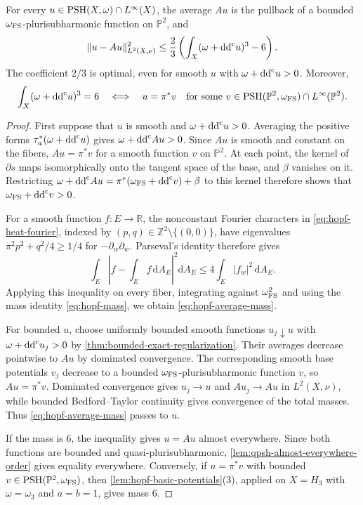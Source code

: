 \begin{proposition}\label{prop:hopf-fiber-average}
For every $u\in\mathrm{PSH}(X,\omega)\cap L^\infty(X)$, the average $Au$ is the pullback of a bounded $\omega_{\mathrm{FS}}$-plurisubharmonic function on $\mathbb P^2$, and
\begin{equation}\label{eq:hopf-average-mass}
 \|u-Au\|_{L^2(X,\nu)}^2
 \leq\frac23\left(\int_X(\omega+\mathrm{dd}^{\mathrm{c}} u)^3-6\right).
\end{equation}
The coefficient $2/3$ is optimal, even for smooth $u$ with $\omega+\mathrm{dd}^{\mathrm{c}} u>0$. Moreover,
\[
 \int_X(\omega+\mathrm{dd}^{\mathrm{c}} u)^3=6
 \quad\Longleftrightarrow\quad
 u=\pi^*v\quad\text{for some }
 v\in\mathrm{PSH}(\mathbb P^2,\omega_{\mathrm{FS}})\cap L^\infty(\mathbb P^2).
\]
\end{proposition}
\begin{proof}
First suppose that $u$ is smooth and $\omega+\mathrm{dd}^{\mathrm{c}} u>0$. Averaging the positive forms $\tau_a^*(\omega+\mathrm{dd}^{\mathrm{c}} u)$ gives $\omega+\mathrm{dd}^{\mathrm{c}} Au>0$. Since $Au$ is smooth and constant on the fibers, $Au=\pi^*v$ for a smooth function $v$ on $\mathbb P^2$. At each point, the kernel of $\partial s$ maps isomorphically onto the tangent space of the base, and $\beta$ vanishes on it. Restricting $\omega+\mathrm{dd}^{\mathrm{c}} Au=\pi^*(\omega_{\mathrm{FS}}+\mathrm{dd}^{\mathrm{c}} v)+\beta$ to this kernel therefore shows that $\omega_{\mathrm{FS}}+\mathrm{dd}^{\mathrm{c}} v>0$.

For a smooth function $f\colon E\to\mathbb R$, the nonconstant Fourier characters in \eqref{eq:hopf-heat-fourier}, indexed by $(p,q)\in\mathbb Z^2\setminus\{(0,0)\}$, have eigenvalues
$\pi^2p^2+q^2/4\geq1/4$ for $-\partial_w\partial_{\bar w}$. Parseval's identity therefore gives
\[
 \int_E\left|f-\int_Ef\,\mathrm{d}A_E\right|^2\mathrm{d}A_E
 \leq4\int_E|f_w|^2\,\mathrm{d}A_E.
\]
Applying this inequality on every fiber, integrating against $\omega_{\mathrm{FS}}^2$ and using the mass identity \eqref{eq:hopf-mass}, we obtain \eqref{eq:hopf-average-mass}.

For bounded $u$, choose uniformly bounded smooth functions $u_j\downarrow u$ with $\omega+\mathrm{dd}^{\mathrm{c}} u_j>0$ by \cref{thm:bounded-exact-regularization}. Their averages decrease pointwise to $Au$ by dominated convergence. The corresponding smooth base potentials $v_j$ decrease to a bounded $\omega_{\mathrm{FS}}$-plurisubharmonic function $v$, so $Au=\pi^*v$. Dominated convergence gives $u_j\to u$ and $Au_j\to Au$ in $L^2(X,\nu)$, while bounded Bedford--Taylor continuity gives convergence of the total masses. Thus \eqref{eq:hopf-average-mass} passes to $u$.

If the mass is $6$, the inequality gives $u=Au$ almost everywhere. Since both functions are bounded and quasi-plurisubharmonic, \cref{lem:qpsh-almost-everywhere-order} gives equality everywhere. Conversely, if $u=\pi^*v$ with bounded $v\in\mathrm{PSH}(\mathbb P^2,\omega_{\mathrm{FS}})$, then \cref{lem:hopf-basic-potentials}(3), applied on $X=H_3$ with $\omega=\omega_3$ and $a=b=1$, gives mass $6$.


\end{proof}

